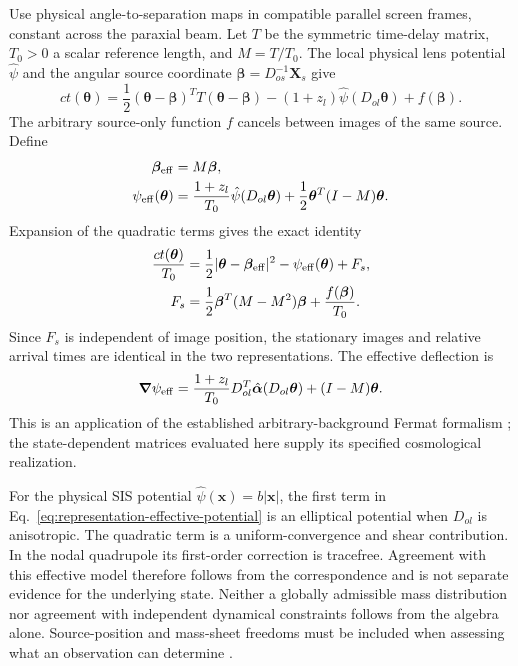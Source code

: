 Use physical angle-to-separation maps in compatible parallel screen frames,
constant across the paraxial beam. Let $T$ be the symmetric time-delay matrix,
$T_0>0$ a scalar reference length, and $M=T/T_0$. The local physical lens
potential $\hat\psi$ and the angular source coordinate
$\boldsymbol\beta=D_{os}^{-1}\boldsymbol X_s$ give
\begin{equation}
 ct(\boldsymbol\theta)
 =\frac12(\boldsymbol\theta-\boldsymbol\beta)^T
 T(\boldsymbol\theta-\boldsymbol\beta)
 -(1+z_l)\hat\psi(D_{ol}\boldsymbol\theta)+f(\boldsymbol\beta).
 \label{eq:representation-original-fermat}
\end{equation}
The arbitrary source-only function $f$ cancels between images of the same
source. Define
\begin{align}
 \boldsymbol\beta_{\rm eff}&=M\boldsymbol\beta,
 \label{eq:representation-effective-source}\\
 \psi_{\rm eff}(\boldsymbol\theta)
 &=\frac{1+z_l}{T_0}\hat\psi(D_{ol}\boldsymbol\theta)
 +\frac12\boldsymbol\theta^T(I-M)\boldsymbol\theta.
 \label{eq:representation-effective-potential}
\end{align}
Expansion of the quadratic terms gives the exact identity
\begin{align}
 \frac{ct(\boldsymbol\theta)}{T_0}
 &=\frac12|\boldsymbol\theta-\boldsymbol\beta_{\rm eff}|^2
   -\psi_{\rm eff}(\boldsymbol\theta)+F_s,\nonumber\\
 F_s&=\frac12\boldsymbol\beta^T(M-M^2)\boldsymbol\beta
       +\frac{f(\boldsymbol\beta)}{T_0}.
 \label{eq:representation-exact-identity}
\end{align}
Since $F_s$ is independent of image position, the stationary images and
relative arrival times are identical in the two representations. The
effective deflection is
\begin{equation}
 \boldsymbol\nabla\psi_{\rm eff}
 =\frac{1+z_l}{T_0}D_{ol}^T
   \hat{\boldsymbol\alpha}(D_{ol}\boldsymbol\theta)
   +(I-M)\boldsymbol\theta.
 \label{eq:representation-effective-deflection}
\end{equation}
This is an application of the established arbitrary-background Fermat
formalism \cite{Fleury2021Arbitrary}; the state-dependent matrices evaluated
here supply its specified cosmological realization.

For the physical SIS potential $\hat\psi(\boldsymbol x)=b|\boldsymbol x|$,
the first term in Eq.~\eqref{eq:representation-effective-potential} is an
elliptical potential when $D_{ol}$ is anisotropic. The quadratic term is a
uniform-convergence and shear contribution. In the nodal quadrupole its
first-order correction is tracefree. Agreement with this effective model
therefore follows from the correspondence and is not separate evidence for
the underlying state. Neither a globally admissible mass distribution nor
agreement with independent dynamical constraints follows from the algebra
alone. Source-position and mass-sheet freedoms must be included when assessing
what an observation can determine \cite{SchneiderSluse2014SPT}.

